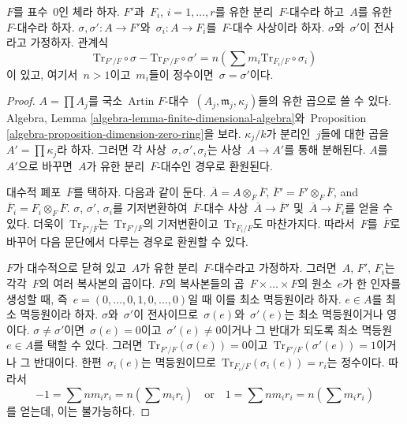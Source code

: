 \begin{lemma}
\label{lemma-algebra-relations}
$F$를 표수\  $0$인 체라 하자. $F'$과\  $F_i$, $i = 1, \ldots, r$를
유한 분리\  $F$-대수라 하고\  $A$를 유한\  $F$-대수라 하자.
$\sigma, \sigma' : A \to F'$와\  $\sigma_i : A \to F_i$를\ 
$F$-대수 사상이라 하자. $\sigma$와\  $\sigma'$이 전사라고 가정하자.
관계식
$$
\text{Tr}_{F'/F} \circ \sigma - \text{Tr}_{F'/F} \circ \sigma' =
n(\sum m_i \text{Tr}_{F_i/F} \circ \sigma_i)
$$
이 있고, 여기서\  $n > 1$이고\  $m_i$들이 정수이면\ 
$\sigma = \sigma'$이다.
\end{lemma}

\begin{proof}
$A = \prod A_j$를 국소\  Artin $F$-대수\ 
$(A_j, \mathfrak m_j, \kappa_j)$들의 유한 곱으로 쓸 수 있다. Algebra,
Lemma \ref{algebra-lemma-finite-dimensional-algebra}와\  Proposition
\ref{algebra-proposition-dimension-zero-ring}을 보라.
$\kappa_j/k$가 분리인\  $j$들에 대한 곱을\  $A' = \prod \kappa_j$라
하자. 그러면 각 사상\  $\sigma, \sigma', \sigma_i$는 사상\ 
$A \to A'$를 통해 분해된다. $A$를\  $A'$으로 바꾸면\  $A$가 유한 분리\ 
$F$-대수인 경우로 환원된다.

\medskip\noindent
대수적 폐포\  $\overline{F}$를 택하자. 다음과 같이 둔다.
$\overline{A} = A \otimes_F \overline{F}$,
$\overline{F}' = F' \otimes_F \overline{F}$, and
$\overline{F}_i = F_i \otimes_F \overline{F}$.
$\sigma$, $\sigma'$, $\sigma_i$를 기저변환하여\ 
$\overline{F}$-대수 사상\  $\overline{A} \to \overline{F}'$ 및\ 
$\overline{A} \to \overline{F}_i$를 얻을 수 있다. 더욱이\ 
$\text{Tr}_{\overline{F}'/\overline{F}}$는\ 
$\text{Tr}_{F'/F}$의 기저변환이고\  $\text{Tr}_{F_i/F}$도 마찬가지다.
따라서\  $F$를\  $\overline{F}$로 바꾸어 다음 문단에서 다루는 경우로
환원할 수 있다.

\medskip\noindent
$F$가 대수적으로 닫혀 있고\  $A$가 유한 분리\  $F$-대수라고 가정하자.
그러면\  $A$, $F'$, $F_i$는 각각\  $F$의 여러 복사본의 곱이다.
$F$의 복사본들의 곱\  $F \times \ldots \times F$의 원소\  $e$가 한
인자를 생성할 때, 즉\ 
$e = (0, \ldots, 0, 1, 0, \ldots, 0)$일 때 이를 최소 멱등원이라
하자. $e \in A$를 최소 멱등원이라 하자. $\sigma$와\  $\sigma'$이
전사이므로\  $\sigma(e)$와\  $\sigma'(e)$는 최소 멱등원이거나 영이다.
$\sigma \not = \sigma'$이면\  $\sigma(e) = 0$이고\ 
$\sigma'(e) \not = 0$이거나 그 반대가 되도록 최소 멱등원\ 
$e \in A$를 택할 수 있다. 그러면\ 
$\text{Tr}_{F'/F}(\sigma(e)) = 0$이고\ 
$\text{Tr}_{F'/F}(\sigma'(e)) = 1$이거나 그 반대이다. 한편\ 
$\sigma_i(e)$는 멱등원이므로\ 
$\text{Tr}_{F_i/F}(\sigma_i(e)) = r_i$는 정수이다. 따라서
$$
-1 = \sum n m_i r_i = n (\sum m_i r_i)
\quad\text{or}\quad
1 = \sum n m_i r_i = n (\sum m_i r_i)
$$
를 얻는데, 이는 불가능하다.
\end{proof}

